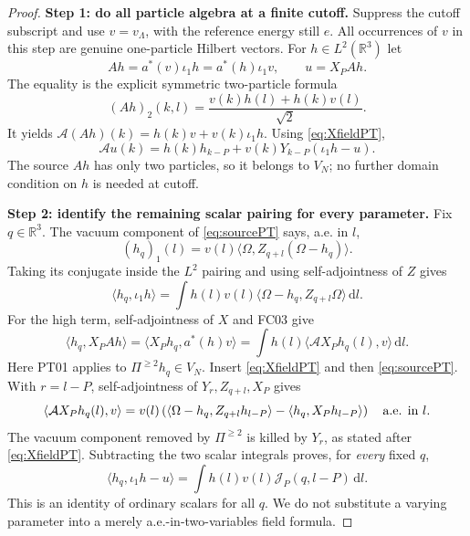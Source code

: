 \documentclass[11pt,a4paper]{article}
\theoremstyle{remark}\newtheorem{remark}[theorem]{Remark}
\newcommand{\R}{\mathbb R}\newcommand{\C}{\mathbb C}\newcommand{\N}{\mathbb N}
\newcommand{\ip}[2]{\langle #1,#2\rangle}\newcommand{\norm}[1]{\lVert #1\rVert}
\newcommand{\dd}{\,\mathrm d}\newcommand{\almosteverywhere}{\text{a.e.}}
\begin{document}
\begin{proof}
\textbf{Step 1: do all particle algebra at a finite cutoff.}
Suppress the cutoff subscript and use $v=v_\Lambda$, with the reference energy still $e$. All occurrences of $v$ in this step are genuine one-particle Hilbert vectors. For $h\in L^2(\R^3)$ let
\[
 A h=a^*(v)\iota_1h=a^*(h)\iota_1v,
 \qquad u=X_PA h.
\]
The equality is the explicit symmetric two-particle formula
\[
 (Ah)_2(k,l)=\frac{v(k)h(l)+h(k)v(l)}{\sqrt2}.
\]
It yields
$\mathcal A(Ah)(k)=h(k)v+v(k)\iota_1h$.
Using \eqref{eq:XfieldPT},
\begin{equation}
 \mathcal A u(k)=h(k)h_{k-P}
                  +v(k)Y_{k-P}(\iota_1h-u).
 \label{eq:kernelstep1}
\end{equation}
The source $Ah$ has only two particles, so it belongs to $V_N$; no further domain condition on $h$ is needed at cutoff.

\textbf{Step 2: identify the remaining scalar pairing for every parameter.}
Fix $q\in\R^3$. The vacuum component of \eqref{eq:sourcePT} says, a.e. in $l$,
\[
 (h_q)_1(l)=v(l)\ip\Omega{Z_{q+l}(\Omega-h_q)}.
\]
Taking its conjugate inside the $L^2$ pairing and using self-adjointness of $Z$ gives
\begin{equation}
 \ip{h_q}{\iota_1h}
 =\int h(l)v(l)\ip{\Omega-h_q}{Z_{q+l}\Omega}\dd l.
 \label{eq:kernelstep2}
\end{equation}
For the high term, self-adjointness of $X$ and FC03 give
\[
 \ip{h_q}{X_PA h}
 =\ip{X_Ph_q}{a^*(h)v}
 =\int h(l)\ip{\mathcal A X_Ph_q(l)}v\dd l.
\]
Here PT01 applies to $\Pi^{\geq2}h_q\in V_N$. Insert \eqref{eq:XfieldPT} and then \eqref{eq:sourcePT}. With $r=l-P$, self-adjointness of $Y_r,Z_{q+l},X_P$ gives
\begin{equation}
 \ip{\mathcal A X_Ph_q(l)}v
 =v(l)\left(\ip{\Omega-h_q}{Z_{q+l}h_{l-P}}
                         -\ip{h_q}{X_Ph_{l-P}}\right)
 \quad\hbox{a.e. in }l.
 \label{eq:kernelstep3}
\end{equation}
The vacuum component removed by $\Pi^{\geq2}$ is killed by $Y_r$, as stated after \eqref{eq:XfieldPT}. Subtracting the two scalar integrals proves, for \emph{every} fixed $q$,
\begin{equation}
 \ip{h_q}{\iota_1h-u}
       =\int h(l)v(l)\mathcal J_P(q,l-P)\dd l.
 \label{eq:kernelstep4}
\end{equation}
This is an identity of ordinary scalars for all $q$. We do not substitute a varying parameter into a merely a.e.-in-two-variables field formula.


\end{proof}
\end{document}
